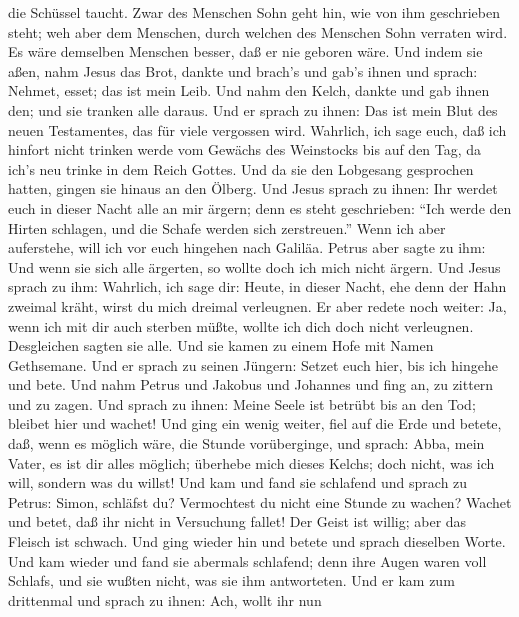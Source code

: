 die Schüssel taucht.  Zwar des Menschen Sohn geht hin, wie
von ihm geschrieben steht; weh aber dem Menschen, durch welchen des
Menschen Sohn verraten wird. Es wäre demselben Menschen besser, daß er
nie geboren wäre.  Und indem sie aßen, nahm Jesus das Brot,
dankte und brach's und gab's ihnen und sprach: Nehmet, esset; das ist
mein Leib.  Und nahm den Kelch, dankte und gab ihnen den;
und sie tranken alle daraus.  Und er sprach zu ihnen: Das
ist mein Blut des neuen Testamentes, das für viele vergossen wird.
 Wahrlich, ich sage euch, daß ich hinfort nicht trinken
werde vom Gewächs des Weinstocks bis auf den Tag, da ich's neu trinke in
dem Reich Gottes.  Und da sie den Lobgesang gesprochen
hatten, gingen sie hinaus an den Ölberg.  Und Jesus sprach
zu ihnen: Ihr werdet euch in dieser Nacht alle an mir ärgern; denn es
steht geschrieben: ``Ich werde den Hirten schlagen, und die Schafe
werden sich zerstreuen.''  Wenn ich aber auferstehe, will
ich vor euch hingehen nach Galiläa.  Petrus aber sagte zu
ihm: Und wenn sie sich alle ärgerten, so wollte doch ich mich nicht
ärgern.  Und Jesus sprach zu ihm: Wahrlich, ich sage dir:
Heute, in dieser Nacht, ehe denn der Hahn zweimal kräht, wirst du mich
dreimal verleugnen.  Er aber redete noch weiter: Ja, wenn
ich mit dir auch sterben müßte, wollte ich dich doch nicht verleugnen.
Desgleichen sagten sie alle.  Und sie kamen zu einem Hofe
mit Namen Gethsemane. Und er sprach zu seinen Jüngern: Setzet euch hier,
bis ich hingehe und bete.  Und nahm Petrus und Jakobus und
Johannes und fing an, zu zittern und zu zagen.  Und sprach
zu ihnen: Meine Seele ist betrübt bis an den Tod; bleibet hier und
wachet!  Und ging ein wenig weiter, fiel auf die Erde und
betete, daß, wenn es möglich wäre, die Stunde vorüberginge,
 und sprach: Abba, mein Vater, es ist dir alles möglich;
überhebe mich dieses Kelchs; doch nicht, was ich will, sondern was du
willst!  Und kam und fand sie schlafend und sprach zu
Petrus: Simon, schläfst du? Vermochtest du nicht eine Stunde zu wachen?
 Wachet und betet, daß ihr nicht in Versuchung fallet! Der
Geist ist willig; aber das Fleisch ist schwach.  Und ging
wieder hin und betete und sprach dieselben Worte.  Und kam
wieder und fand sie abermals schlafend; denn ihre Augen waren voll
Schlafs, und sie wußten nicht, was sie ihm antworteten. 
Und er kam zum drittenmal und sprach zu ihnen: Ach, wollt ihr nun
